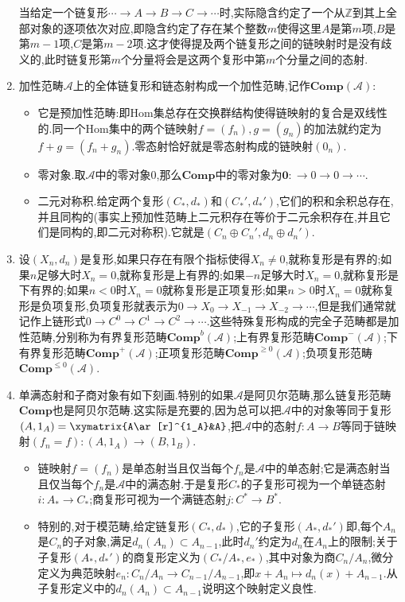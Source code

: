 \begin{enumerate}
	当给定一个链复形$\cdots\to A\to B\to C\to\cdots$时,实际隐含约定了一个从$\mathbb{Z}$到其上全部对象的逐项依次对应,即隐含约定了存在某个整数$m$使得这里$A$是第$m$项,$B$是第$m-1$项,$C$是第$m-2$项.这才使得提及两个链复形之间的链映射时是没有歧义的,此时链复形第$m$个分量将会是这两个复形中第$m$个分量之间的态射.
	\item 加性范畴$\mathscr{A}$上的全体链复形和链态射构成一个加性范畴,记作$\textbf{Comp}(\mathscr{A})$:
	\begin{itemize}
		\item 它是预加性范畴:即Hom集总存在交换群结构使得链映射的复合是双线性的.同一个Hom集中的两个链映射$f=(f_n),g=(g_n)$的加法就约定为$f+g=(f_n+g_n)$.零态射恰好就是零态射构成的链映射$(0_n)$.
		\item 零对象.取$\mathscr{A}$中的零对象0,那么$\textbf{Comp}$中的零对象为$\textbf{0}:\to0\to0\to\cdots$.
		\item 二元对称积.给定两个复形$(C_*,d_*)$和$(C_*',d_*')$,它们的积和余积总存在,并且同构的(事实上预加性范畴上二元积存在等价于二元余积存在,并且它们是同构的,即二元对称积).它就是$(C_n\oplus C_n',d_n\oplus d_n')$.
	\end{itemize}
    \item 设$(X_n,d_n)$是复形,如果只存在有限个指标使得$X_n\not=0$,就称复形是有界的;如果$n$足够大时$X_n=0$,就称复形是上有界的;如果$-n$足够大时$X_n=0$,就称复形是下有界的;如果$n<0$时$X_n=0$就称复形是正项复形;如果$n>0$时$X_n=0$就称复形是负项复形,负项复形就表示为$0\to X_0\to X_{-1}\to X_{-2}\to\cdots$,但是我们通常就记作上链形式$0\to C^0\to C^1\to C^2\to\cdots$.这些特殊复形构成的完全子范畴都是加性范畴,分别称为有界复形范畴$\textbf{Comp}^b(\mathscr{A})$;上有界复形范畴$\textbf{Comp}^-(\mathscr{A})$;下有界复形范畴$\textbf{Comp}^+(\mathscr{A})$;正项复形范畴$\textbf{Comp}^{\ge0}(\mathscr{A})$;负项复形范畴$\textbf{Comp}^{\le0}(\mathscr{A})$.
	\item 单满态射和子商对象有如下刻画.特别的如果$\mathscr{A}$是阿贝尔范畴,那么链复形范畴$\textbf{Comp}$也是阿贝尔范畴.这实际是充要的,因为总可以把$\mathscr{A}$中的对象等同于复形$(A,1_A)=\xymatrix{A\ar[r]^{1_A}&A}$,把$\mathscr{A}$中的态射$f:A\to B$等同于链映射$(f_n=f):(A,1_A)\to(B,1_B)$.
	\begin{itemize}
		\item 链映射$f=(f_n)$是单态射当且仅当每个$f_n$是$\mathscr{A}$中的单态射;它是满态射当且仅当每个$f_n$是$\mathscr{A}$中的满态射.于是复形$C_*$的子复形可视为一个单链态射$i:A_*\to C_*$;商复形可视为一个满链态射$j:C^*\to B^*$.
		\item 特别的,对于模范畴,给定链复形$(C_*,d_*)$,它的子复形$(A_*,d_*')$即,每个$A_n$是$C_n$的子对象,满足$d_n(A_n)\subset A_{n-1}$,此时$d_n'$约定为$d_n$在$A_n$上的限制;关于子复形$(A_*,d_*')$的商复形定义为$(C_*/A_*,e_*)$,其中对象为商$C_n/A_n$,微分定义为典范映射$e_n:C_n/A_n\to C_{n-1}/A_{n-1}$,即$x+A_n\mapsto d_n(x)+A_{n-1}$.从子复形定义中的$d_n(A_n)\subset A_{n-1}$说明这个映射定义良性.

\end{itemize}
\end{enumerate}
